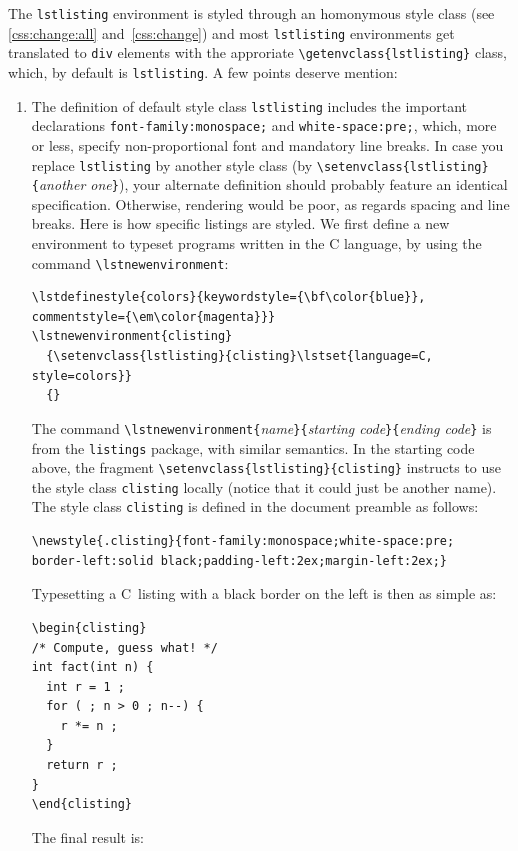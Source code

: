 The \texttt{lstlisting} environment is styled through
an homonymous style class (see \ref{css:change:all} and~\ref{css:change}) and
most \texttt{lstlisting} environments get translated to \verb+div+
elements with the approriate \verb+\getenvclass{lstlisting}+ class, 
which, by default is \texttt{lstlisting}.
A few points deserve mention:
\begin{enumerate}
\item The definition of default style class \texttt{lstlisting} includes
the important declarations
\verb+font-family:monospace;+ and \verb+white-space:pre;+, which, more or less,
specify non-proportional font and mandatory line breaks.
In case you replace \texttt{lstlisting} by another style class (by
\verb+\setenvclass{lstlisting}{+\textit{another one}\verb+}+), your
alternate definition should probably feature an identical
specification. Otherwise, rendering would be poor, as regards spacing
and line breaks.
\ifhevea
Here is how specific listings are styled.
We first define a new environment to typeset programs written in the C
language, by using the command \verb+\lstnewenvironment+:
\begin{verbatim}
\lstdefinestyle{colors}{keywordstyle={\bf\color{blue}}, commentstyle={\em\color{magenta}}}
\lstnewenvironment{clisting}
  {\setenvclass{lstlisting}{clisting}\lstset{language=C, style=colors}}
  {}
\end{verbatim}
The command
\verb+\lstnewenvironment{+\textit{name}\verb+}{+\textit{starting
code}\verb+}{+\textit{ending code}\verb+}+ is from the
\texttt{listings} package, with similar semantics.
In the starting code above, the fragment
\verb+\setenvclass{lstlisting}{clisting}+ instructs \hevea{} to
use the style class \texttt{clisting} locally (notice that it could just
be another name). The style class \texttt{clisting} is defined in
the document preamble as follows:
\begin{verbatim}
\newstyle{.clisting}{font-family:monospace;white-space:pre;
border-left:solid black;padding-left:2ex;margin-left:2ex;}
\end{verbatim}
Typesetting a C~listing with a black border on the left is then as
simple as:
\begin{verbatim}
\begin{clisting}
/* Compute, guess what! */
int fact(int n) {
  int r = 1 ;
  for ( ; n > 0 ; n--) {
    r *= n ;
  }
  return r ;
}
\end{clisting}
\end{verbatim}
The final result is:
\begingroup%
\end{enumerate}
